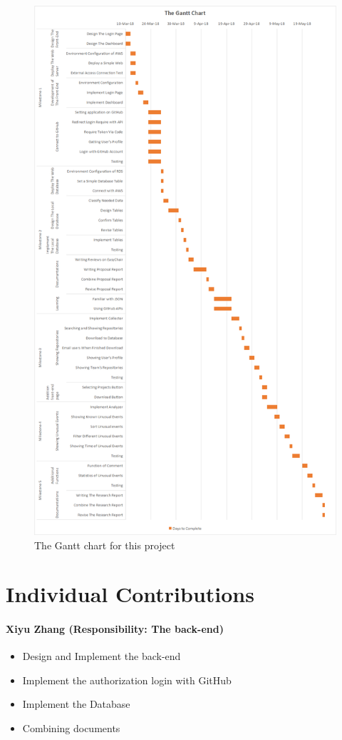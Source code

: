 \documentclass[conference]{IEEEtran}
\begin{document}
\begin{figure}[!ht]
\centering
\includegraphics[scale=0.35]{the_Gantt_chart}
\caption{The Gantt chart for this project}
\end{figure}


\section{Individual Contributions}


\paragraph{\textbf{Xiyu Zhang (Responsibility: The back-end)}}
\medskip
\begin{itemize}
\item Design and Implement the back-end
\item Implement the authorization login with GitHub
\item Implement the Database
\item Combining documents
\end{itemize}
\bigskip
\end{document}
